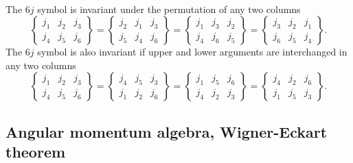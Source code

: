 \documentclass[%
twoside,                 %
final,                   %
10pt]{article}
\begin{document}
\paragraph{}
The $6j$ symbol is invariant under the permutation of any two columns
\[
    \begin{Bmatrix} j_1 & j_2 & j_3\\ j_4 & j_5 & j_6 \end{Bmatrix} = \begin{Bmatrix} j_2 & j_1 & j_3\\ j_5 & j_4 & j_6 \end{Bmatrix} = \begin{Bmatrix} j_1 & j_3 & j_2\\ j_4 & j_6 & j_5 \end{Bmatrix} = \begin{Bmatrix} j_3 & j_2 & j_1\\ j_6 & j_5 & j_4 \end{Bmatrix}. 
\]
The $6j$ symbol is also invariant if upper and lower arguments are interchanged in any two columns
\[
    \begin{Bmatrix} j_1 & j_2 & j_3\\ j_4 & j_5 & j_6 \end{Bmatrix} = \begin{Bmatrix} j_4 & j_5 & j_3\\ j_1 & j_2 & j_6 \end{Bmatrix} = \begin{Bmatrix} j_1 & j_5 & j_6\\ j_4 & j_2 & j_3 \end{Bmatrix} = \begin{Bmatrix} j_4 & j_2 & j_6\\ j_1 & j_5 & j_3 \end{Bmatrix}. 
\]



\subsection*{Angular momentum algebra, Wigner-Eckart theorem}

\end{document}
